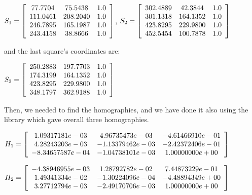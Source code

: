 \documentclass[]{article}
\begin{document}
\centerline {
		$S_1 =\left[ {\begin{array}{*{20}c}
		77.7704 & 75.5438 & 1.0 \\
		111.0461 & 208.2040 & 1.0  \\ 
		246.7895 & 165.1987 & 1.0 \\
		243.4158 & 38.8666 & 1.0  
		\end{array} } \right] $, $S_2 =\left[ {\begin{array}{*{20}c}
		302.4889 & 42.3844 & 1.0 \\
		301.1318 & 164.1352 & 1.0  \\ 
		423.8295 & 229.9800 & 1.0 \\
		452.5454 & 100.7878 & 1.0  
		\end{array} } \right] $
}

\vspace{0.5em}

and the last square's coordinates are: 

\vspace{0.5em}

\centerline {
	$S_3 =\left[ {\begin{array}{*{20}c}
		250.2883 & 197.7703 & 1.0 \\
		174.3199 & 164.1352 & 1.0  \\ 
		423.8295 & 229.9800 & 1.0 \\
		348.1797 & 362.9188 & 1.0  
		\end{array} } \right] $
}

\vspace{0.5em}

Then, we needed to find the homographies, and we have done it also using the library which gave overall three homographies. 

\vspace{0.5em}

\centerline {
	$H_1 =\left[ {\begin{array}{*{20}c}
		1.09317181e-03 & 4.96735473e-03 & -4.61466910e-01 \\
		4.28243203e-03 & -1.13379462e-03 & -2.42372406e-01  \\ 
		-8.34657587e-04 & -1.04738101e-03 & 1.00000000e+00 
		\end{array} } \right] $
}

\vspace{0.5em}

\centerline {
	$H_2 =\left[ {\begin{array}{*{20}c}
		-4.38946955e-03 & 1.28792782e-02 & 7.44873229e-01 \\
		1.49341334e-02 & -1.30224096e-04 & -4.48894349e+00  \\ 
		3.27712794e-03 & -2.49170706e-03 & 1.00000000e+00
		\end{array} } \right] $
}
\end{document}
